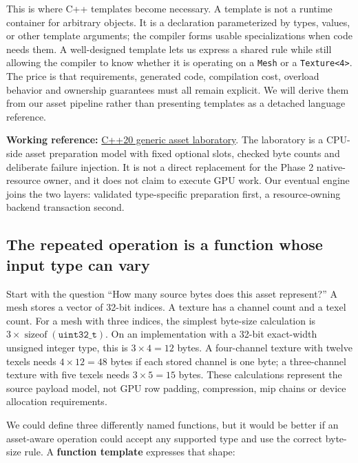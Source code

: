 This is where C++ templates become necessary. A template is not a runtime container for arbitrary objects. It is a declaration parameterized by types, values, or other template arguments; the compiler forms usable specializations when code needs them. A well-designed template lets us express a shared rule while still allowing the compiler to know whether it is operating on a \texttt{Mesh} or a \texttt{Texture\textless{}4\textgreater{}}. The price is that requirements, generated code, compilation cost, overload behavior and ownership guarantees must all remain explicit. We will derive them from our asset pipeline rather than presenting templates as a detached language reference.

\textbf{Working reference:} \hyperref[source-file-a5db53514d74ae247b4ac42f]{C++20 generic asset laboratory}. The laboratory is a CPU-side asset preparation model with fixed optional slots, checked byte counts and deliberate failure injection. It is not a direct replacement for the Phase 2 native-resource owner, and it does not claim to execute GPU work. Our eventual engine joins the two layers: validated type-specific preparation first, a resource-owning backend transaction second.

\subsection{The repeated operation is a function whose input type can vary}\label{05-engine-i-ch005-the-repeated-operation-is-a-function-whose-input-type-can-vary}

Start with the question ``How many source bytes does this asset represent?'' A mesh stores a vector of 32-bit indices. A texture has a channel count and a texel count. For a mesh with three indices, the simplest byte-size calculation is \(3\times\operatorname{sizeof}(\texttt{uint32\_t})\). On an implementation with a 32-bit exact-width unsigned integer type, this is \(3\times4=12\) bytes. A four-channel texture with twelve texels needs \(4\times12=48\) bytes if each stored channel is one byte; a three-channel texture with five texels needs \(3\times5=15\) bytes. These calculations represent the source payload model, not GPU row padding, compression, mip chains or device allocation requirements.

We could define three differently named functions, but it would be better if an asset-aware operation could accept any supported type and use the correct byte-size rule. A \textbf{function template} expresses that shape:


